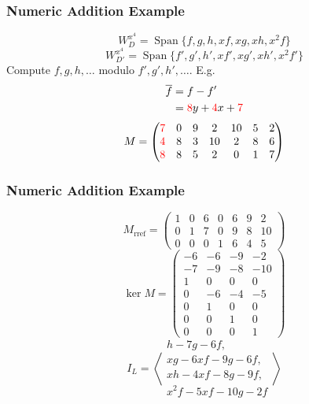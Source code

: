 \documentclass{beamer}
\newcommand{\pid}[1]{\left\langle #1 \right\rangle}
\DeclareMathOperator{\Span}{Span}
\renewcommand{\bar}{\overline}
\begin{document}

\begin{frame}[fragile]
\frametitle{Numeric Addition Example}
  \[W_D^{x^4} = \Span\{ f, g, h, xf, xg, xh, x^2f \} \]
  \[W_{D'}^{x^4} = \Span\{ f', g', h', xf', xg', xh', x^2f' \} \]
  Compute $f, g, h, \dots$ modulo $f', g', h', \dots$. E.g.
  \begin{align*}
    \bar f &= f - f' \\ &= {\color{red}8}y + {\color{red}4}x + {\color{red}7}
  \end{align*}
  \[ M = \begin{pmatrix}
    {\color{red}7} & 0 & 9 & 2 & 10 & 5 & 2 \\
    {\color{red}4} & 8 & 3 & 10 & 2 & 8 & 6 \\
    {\color{red}8} & 8 & 5 & 2 & 0 & 1 & 7
  \end{pmatrix} \]
\end{frame}


\begin{frame}[fragile]
\frametitle{Numeric Addition Example}
  \[ M_{\text{rref}} = \begin{pmatrix}
    1 & 0 & 6 & 0 & 6 & 9 & 2 \\
    0 & 1 & 7 & 0 & 9 & 8 & 10 \\
    0 & 0 & 0 & 1 & 6 & 4 & 5
  \end{pmatrix} \]
  \[ \ker M =
  \begin{pmatrix}
    -6 & -6 & -9 & -2 \\
    -7 & -9 & -8 & -10 \\
     1 &  0 &  0 &  0 \\
     0 & -6 & -4 & -5 \\
     0 &  1 &  0 &  0 \\
     0 &  0 &  1 &  0 \\
     0 &  0 &  0 &  1
  \end{pmatrix} \]
  \[ I_L = \pid{ \begin{array}{l}
      h - 7g - 6f, \\
      xg - 6xf - 9g - 6f, \\
      xh - 4xf - 8g - 9f, \\
      x^2f - 5xf - 10g - 2f \end{array} } \]
\end{frame}

\end{document}
